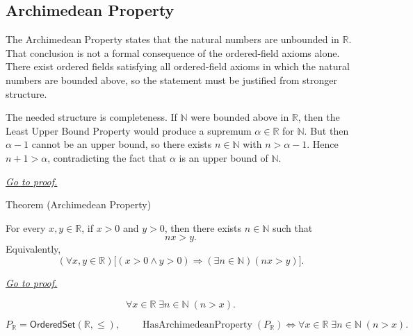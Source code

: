 
\subsection*{Archimedean Property}

\begin{remark*}[Interpretation]
The Archimedean Property states that the natural numbers are unbounded in
$\mathbb{R}$. That conclusion is not a formal consequence of the ordered-field
axioms alone. There exist ordered fields satisfying all ordered-field axioms in
which the natural numbers are bounded above, so the statement must be justified
from stronger structure.

The needed structure is completeness. If $\mathbb{N}$ were bounded above in
$\mathbb{R}$, then the Least Upper Bound Property would produce a supremum
$\alpha \in \mathbb{R}$ for $\mathbb{N}$. But then $\alpha - 1$ cannot be an
upper bound, so there exists $n \in \mathbb{N}$ with $n > \alpha - 1$. Hence
$n+1 > \alpha$, contradicting the fact that $\alpha$ is an upper bound of
$\mathbb{N}$.

\smallskip
\noindent
\hyperref[prf:archimedean-property]{\textit{Go to proof.}}
\end{remark*}




\begin{theorembox}{Theorem (Archimedean Property)}
\begin{theorem}
\label{thm:archimedean-property}
For every $x,y\in\mathbb{R}$, if $x>0$ and $y>0$, then there exists
$n\in\mathbb{N}$ such that
\[
  nx>y.
\]
Equivalently,
\[
  (\forall x,y\in\mathbb{R})
  \bigl[(x>0\land y>0)\Longrightarrow(\exists n\in\mathbb{N})(nx>y)\bigr].
\]

\smallskip
\noindent
\hyperref[prf:archimedean-property]{\textit{Go to proof.}}
\end{theorem}
\end{theorembox}

\begin{remark*}
\[
\forall x\in\mathbb{R}\;\exists n\in\mathbb{N}\;(n>x).
\]
\end{remark*}

\begin{remark*}
\[
P_{\mathbb{R}}=\mathsf{OrderedSet}(\mathbb{R},\leq),\qquad
\operatorname{HasArchimedeanProperty}(P_{\mathbb{R}})\Longleftrightarrow
\forall x\in\mathbb{R}\;\exists n\in\mathbb{N}\;(n>x).
\]
\end{remark*}

